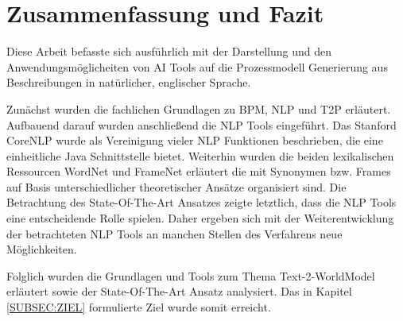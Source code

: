 \section{Zusammenfassung und Fazit}
Diese Arbeit befasste sich ausführlich mit der Darstellung und den An\-wen\-dungs\-mög\-lic\-hei\-ten von \ac{AI} Tools auf die Prozessmodell Generierung aus Beschreibungen in natürlicher, englischer Sprache.\par Zunächst wurden die fachlichen Grundlagen zu \ac{BPM}, \ac{NLP} und \ac{T2P} erläutert. Aufbauend darauf wurden anschließend die \ac{NLP} Tools eingeführt. Das Stanford CoreNLP wurde als Vereinigung vieler \ac{NLP} Funktionen beschrieben, die eine einheitliche Java Schnittstelle bietet. Weiterhin wurden die beiden lexikalischen Ressourcen WordNet und FrameNet erläutert die mit Synonymen bzw. Frames auf Basis unterschiedlicher theoretischer Ansätze organisiert sind.
Die Betrachtung des State-Of-The-Art Ansatzes zeigte letztlich, dass die \ac{NLP} Tools eine entscheidende Rolle spielen. Daher ergeben sich mit der Weiterentwicklung der betrachteten \ac{NLP} Tools an manchen Stellen des Verfahrens neue Möglichkeiten.\par
Folglich wurden die Grundlagen und Tools zum Thema Text-2-WorldModel erläutert sowie der State-Of-The-Art Ansatz analysiert. Das in Kapitel \ref{SUBSEC:ZIEL} formulierte Ziel wurde somit erreicht.

